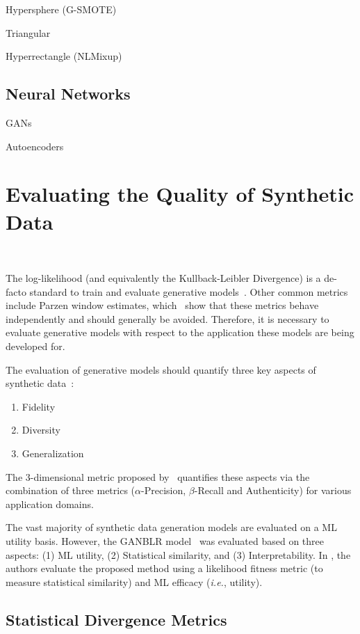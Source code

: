 \documentclass[parskip=full]{scrartcl}
\begin{document}
Hypersphere (G-SMOTE)

Triangular

Hyperrectangle (NLMixup)

\subsection{Neural Networks}

GANs

Autoencoders

\section{Evaluating the Quality of Synthetic Data
}~\label{sec:evaluating-synthetic-data}

The log-likelihood (and equivalently the Kullback-Leibler Divergence) is a
de-facto standard to train and evaluate generative
models~\cite{theis2016note}. Other common metrics include Parzen window
estimates, which~\citet{theis2016note} show that these metrics behave
independently and should generally be avoided. Therefore, it is necessary
to evaluate generative models with respect to the application these models are
being developed for.


The evaluation of generative models should quantify three key aspects of
synthetic data~\cite{alaa2022faithful}:

\begin{enumerate}
    \item Fidelity
    \item Diversity 
    \item Generalization
\end{enumerate}

The 3-dimensional metric proposed by~\citet{alaa2022faithful} quantifies these
aspects via the combination of three metrics ($\alpha$-Precision,
$\beta$-Recall and Authenticity) for various application domains.

The vast majority of synthetic data generation models are evaluated on a ML
utility basis. However, the GANBLR model~\cite{zhang2021ganblr} was evaluated
based on three aspects: (1) ML utility, (2) Statistical similarity, and (3)
Interpretability. In \citet{xu2019modeling}, the authors evaluate the proposed
method using a likelihood fitness metric (to measure statistical similarity)
and ML efficacy (\textit{i.e.}, utility).

\subsection{Statistical Divergence Metrics} 
\end{document}
